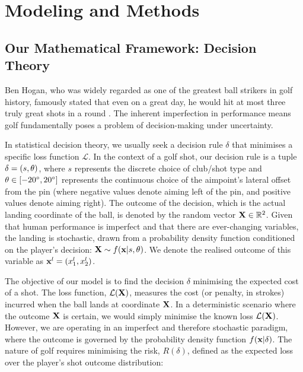 \documentclass[11pt, letterpaper]{article}
\begin{document}
\section{Modeling and Methods}
\label{sec:Modeling}

\subsection{Our Mathematical Framework: Decision Theory}

Ben Hogan, who was widely regarded as one of the greatest ball strikers in golf history, famously stated that even on a great day, he would hit at most three  truly great shots in a round \parencite{Jenkins_1998}. The inherent imperfection in performance means golf fundamentally poses a problem of decision-making under uncertainty.

In statistical decision theory, we usually seek a decision rule $\delta$ that minimises a specific loss function $\mathcal{L}$. In the context of a golf shot, our decision rule is a tuple $\delta = (s, \theta)$, where $s$ represents the discrete choice of club/shot type and $\theta \in [-20^\circ, 20^\circ]$ \fillin represents the continuous choice of the aimpoint's lateral offset from the pin (where negative values denote aiming left of the pin, and positive values denote aiming right). The outcome of the decision, which is the actual landing coordinate of the ball, is denoted by the random vector $\mathbf{X} \in \mathbb{R}^2$. Given that human performance is imperfect and that there are ever-changing variables, the landing is stochastic, drawn from a probability density function conditioned on the player's decision: $\mathbf{X} \sim f(\mathbf{x} | s, \theta) $. We denote the realised outcome of this variable as $\mathbf{x}^l = (x_1^l,x_2^l)$.


The objective of our model is to find the decision $\delta$ minimising the expected cost of a shot. The loss function, $\mathcal{L}(\mathbf{X})$, measures the cost (or penalty, in strokes) incurred when the ball lands at coordinate $\mathbf{X}$. In a deterministic scenario where the outcome $\mathbf{X}$ is certain, we would simply minimise the known loss $\mathcal{L}(\mathbf{X})$. However, we are operating in an imperfect and therefore stochastic paradigm, where the outcome is governed by the probability density function $f(\mathbf{x} | \delta)$. The nature of golf requires minimising the risk, $R(\delta)$, defined as the expected loss over the player's shot outcome distribution:
\end{document}
